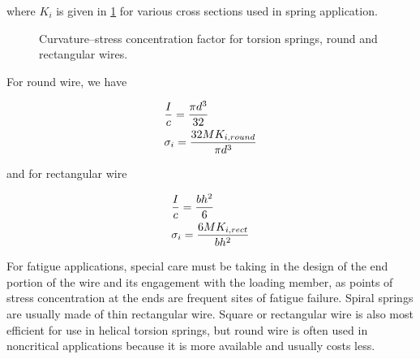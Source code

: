 \documentclass[
10pt,
a4paper,
openany,
svgnames,
]{book}
\begin{document}
where $K_i$ is given in \cref{fig: torsion spring stress conc} for various cross sections used in spring application.

\begin{figure}[h]
  \centering
  \caption{Curvature--stress concentration factor for torsion springs, round and rectangular wires.}
  \label{fig: torsion spring stress conc}
\end{figure}

For round wire, we have

\begin{equation}
  \begin{gathered}
    \frac{I}{c} = \frac{\pi d^3}{32} \hfill \\
    \sigma_i = \frac{32MK_{i,round}}{\pi d^3} \hfill \\ 
  \end{gathered}
\end{equation}

and for rectangular wire

\begin{equation}
  \begin{gathered}
    \frac{I}{c} = \frac{bh^2}{6} \hfill \\
    \sigma_i = \frac{6MK_{i,rect}}{bh^2} \hfill \\ 
  \end{gathered}
\end{equation}

For fatigue applications, special care must be taking in the design of the end portion of the wire and its engagement with the loading member, as points of stress concentration at the ends are frequent sites of fatigue failure.
Spiral springs are usually made of thin rectangular wire. Square or rectangular wire is also most efficient for use in helical torsion springs, but round wire is often used in noncritical applications because it is more available and usually costs less.
\end{document}
